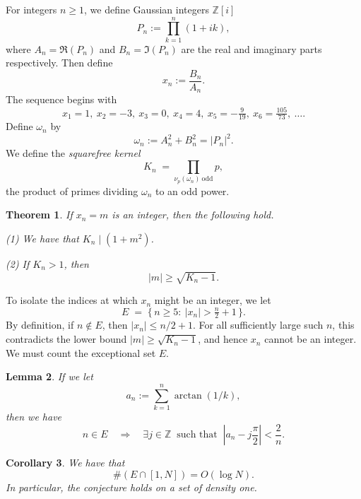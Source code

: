 \documentclass[12pt]{amsart}
\newtheorem{theorem}{Theorem}
\newtheorem{corollary}[theorem]{Corollary}
\newtheorem{lemma}[theorem]{Lemma}
\newcommand{\Z}{\mathbb{Z}}
\begin{document}
For integers $n\geq 1$, we define Gaussian integers $\Z[i]$
\[
P_n:=\prod_{k=1}^{n}(1+ik),
\]
where $A_n=\Re(P_n)$ and $B_n=\Im(P_n)$ are the real and imaginary parts respectively. Then define
$$
x_n:=\frac{B_n}{A_n}.
$$
The sequence begins with
\[
x_1=1,\ x_2=-3,\ x_3=0,\ x_4=4,\ x_5= -\tfrac{9}{19},\ x_6= \tfrac{105}{73},\ \dots.
\]
Define $\omega_n$ by
$$
\omega_n:=A_n^2+B_n^2=|P_n|^2.
$$
We define the \emph{squarefree kernel}
$$
K_n\;=\!\!\prod_{\nu_p(\omega_n)\ \mathrm{odd}}\!\! p,
$$
the product of primes dividing $\omega_n$ to an odd power.

\begin{theorem}\label{thm:main}
If $x_n=m$ is an integer, then the following hold.

\smallskip
\noindent
{\rm(1)} We have that $K_n\mid(1+m^2)$.

\smallskip
\noindent
{\rm(2)} If $K_n>1$, then
\[
|m|\ge\sqrt{K_n-1}.
\]
\end{theorem}

To isolate the indices at which $x_n$ might be an integer, we let
\[
E\;=\;\bigl\{\,n\ge5:\ |x_n|>\tfrac n2+1\,\bigr\}.
\]
By definition, if $n\notin E$, then $|x_n|\le n/2+1$.  For all
sufficiently large such $n$, this contradicts the lower bound
$|m|\ge\sqrt{K_n-1}$, and hence $x_n$ cannot be an integer. 
 We must count the exceptional set $E$. 
 
 \begin{lemma}\label{lem:proximity} If we let
\[
a_n:=\sum_{k=1}^{n}\arctan(1/k),
\]
then we have
\[
n\in E \quad\Longrightarrow\quad \exists j\in\Z\ \text{ such that }\
\left|a_n-j\frac{\pi}{2}\right|<\frac{2}{n}.
\]
\end{lemma}

\begin{corollary}\label{cor:density}
We have that
\[
\#(E\cap[1,N])=O(\log N).
\]
In particular, the conjecture holds on a set of density one.
\end{corollary}
\end{document}
